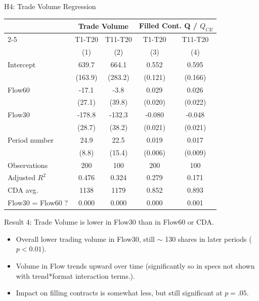 \documentclass[10pt]{beamer}
\begin{document}
\begin{frame}{H4: Trade Volume Regression}
\begin{table}
\centering    
\begin{threeparttable}
\begin{tabular}{@{\extracolsep{5pt}}lcccc}
& \multicolumn{2}{c}{Trade Volume} & \multicolumn{2}{c}{Filled Cont. Q / $Q_{CE}$} \\
\cmidrule{2-5}
& T1-T20 & T11-T20 & T1-T20 & T11-T20 \\
& (1) & (2) & (3) & (4) \\
\midrule
Intercept & 639.7$ $ & 664.1$ $ & 0.552$ $ & 0.595$ $ \\
  & (163.9) & (283.2) & (0.121) & (0.166) \\
Flow60 & -17.1$^{}$ & -3.8$^{}$ & 0.029$^{}$ & 0.026$^{}$ \\
  & (27.1) & (39.8) & (0.020) & (0.022) \\
Flow30 & -178.8$ $ & -132.3$ $ & -0.080$ $ & -0.048$ $ \\
  & (28.7) & (38.2) & (0.021) & (0.021) \\
Period number & 24.9$ $ & 22.5$^{}$ & 0.019$ $ & 0.017$ $ \\
  & (8.8) & (15.4) & (0.006) & (0.009) \\
\midrule
Observations & 200 & 100 & 200 & 100 \\
Adjusted $R^2$ & 0.476 & 0.324 & 0.279 & 0.171 \\
\midrule
CDA avg. & 1138 & 1179 & 0.852 & 0.893 \\
Flow30 = Flow60 ? & 0.000 & 0.000 & 0.000 & 0.001 
\end{tabular}
\end{threeparttable}
\label{tab:Volume}
\end{table}
\end{frame}

\begin{frame}{Result 4: Trade Volume is lower in Flow30 than in Flow60 or CDA.}
\begin{itemize}
\item Overall lower trading volume in Flow30, still $\sim$ 130 shares in later periods ($p < 0.01$).
\item Volume in Flow trends upward over time (significantly so in specs not shown with trend*format interaction terms.).
\item Impact on filling contracts is somewhat less, but still significant at $p=.05$.
\end{itemize}   
\end{frame}
\end{document}
